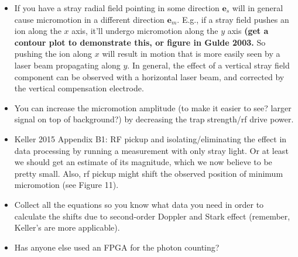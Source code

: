 \documentclass{article}
\begin{document}
\begin{itemize}
\item If you have a stray radial field pointing in some direction $\mathbf{e}_s$ will in general cause micromotion in a different direction $\mathbf{e}_m$. E.g., if a stray field pushes an ion along the $x$ axis, it'll undergo micromotion along the $y$ axis \textbf{(get a contour plot to demonstrate this, or figure in Gulde 2003.} So pushing the ion along $x$ will result in motion that is more easily seen by a laser beam propagating along $y$. In general, the effect of a vertical stray field component can be observed with a horizontal laser beam, and corrected by the vertical compensation electrode.

\item You can increase the micromotion amplitude (to make it easier to see? larger signal on top of background?) by decreasing the trap strength/rf drive power.

\item Keller 2015 Appendix B1: RF pickup and isolating/eliminating the effect in data processing by running a measurement with only stray light. Or at least we should get an estimate of its magnitude, which we now believe to be pretty small. Also, rf pickup might shift the observed position of minimum micromotion (see Figure 11).

\item Collect all the equations so you know what data you need in order to calculate the shifts due to second-order Doppler and Stark effect (remember, Keller's are more applicable).

\item Has anyone else used an FPGA for the photon counting?
\end{itemize}
\end{document}

